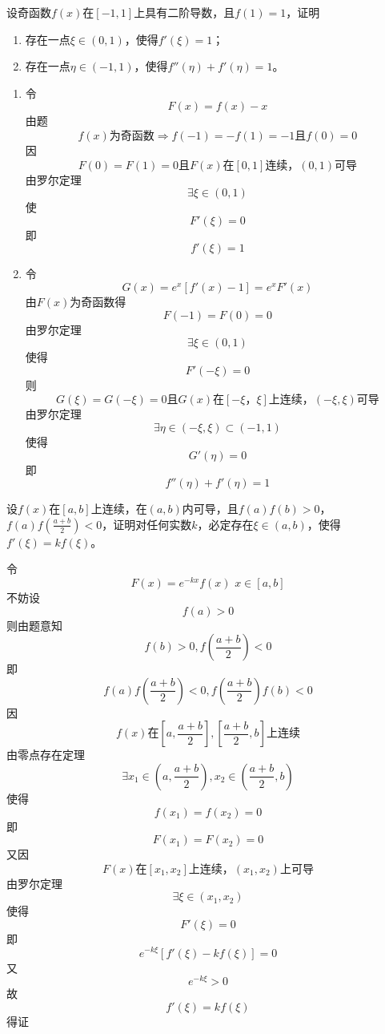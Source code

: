 \begin{example}
	设奇函数$f(x)$在$[-1,1]$上具有二阶导数，且$f(1)=1$，证明
	\begin{enumerate}
		\item 存在一点$\xi\in(0,1)$，使得$f'(\xi)=1$；
		\item 存在一点$\eta\in(-1,1)$，使得$f''(\eta)+f'(\eta)=1$。
	\end{enumerate}
\end{example}
	\begin{newproof}
		\begin{enumerate}
			\item 
			令\[F\left( x \right) =f\left( x \right) -x\]
		由题\[f\left( x \right) 为\text{奇函数}\Longrightarrow f\left( -1 \right) =-f\left( 1 \right) =-1\text{且}f\left( 0 \right) =0\]
		因\[F\left( 0 \right) =F\left( 1 \right) =0\text{且}F\left( x \right) \text{在}\left[ 0,1 \right] \text{连续，}\left( 0,1 \right) \text{可导}\]
		由罗尔定理\[\exists \xi \in \left( 0,1 \right) \]
		使\[F'\left( \xi \right) =0\]
		即\[f'\left( \xi \right) =1\]
			\item
			令\[G\left( x \right) =e^x\left[ f'\left( x \right) -1 \right] =e^xF'\left( x \right) \]
			由$F(x)$为奇函数得\[F\left( -1 \right) =F\left( 0 \right) =0\]
			由罗尔定理\[\exists \xi \in \left( 0,1 \right) \]
			使得\[F'\left( -\xi \right) =0\]
			则\[G\left( \xi \right) =G\left( -\xi \right) =0\text{且}G\left( x \right) \text{在}\left[ -\xi \text{，}\xi \right] \text{上连续，}\left( -\xi ,\xi \right) \text{可导}\]
			由罗尔定理\[\exists \eta \in \left( -\xi ,\xi \right) \subset \left( -1,1 \right) \]
			使得\[G'\left( \eta \right) =0\]
			即\[f''\left( \eta \right) +f'\left( \eta \right) =1\]

		\end{enumerate}
		
	\end{newproof}

\begin{example}
	设$f(x)$在$[a,b]$上连续，在$(a,b)$内可导，且$f(a)f(b)>0$，$f(a)f(\frac{a+b}{2})<0$，证明对任何实数$k$，必定存在$\xi\in(a,b)$，使得$f'(\xi)=kf(\xi)$。
\end{example}
	\begin{newproof}
		令\[F\left( x \right) =e^{-kx}f\left( x \right) \,\,     x\in \left[ a,b \right] \]
		不妨设\[f\left( a \right) >0\]
		则由题意知\[f\left( b \right) >0,f\left( \frac{a+b}{2} \right) <0\]
		即\[f\left( a \right) f\left( \frac{a+b}{2} \right) <0,   f\left( \frac{a+b}{2} \right) f\left( b \right) <0\]
		因\[f\left( x \right) \text{在}\left[ a,\frac{a+b}{2} \right] ,\left[ \frac{a+b}{2},b \right] \text{上连续}\]
		由零点存在定理\[\exists x_1\in \left( a,\frac{a+b}{2} \right) ,x_2\in \left( \frac{a+b}{2},b \right) \]
		使得\[f\left( x_1 \right) =f\left( x_2 \right) =0\]
		即\[F\left( x_1 \right) =F\left( x_2 \right) =0\]
		又因\[F\left( x \right) \text{在}\left[ x_1,x_2 \right] \text{上连续，}\left( x_1,x_2 \right) \text{上可导}\]
		由罗尔定理\[\exists \xi \in \left( x_1,x_2 \right) \]
		使得\[F'\left( \xi \right) =0\]
		即\[e^{-k\xi}\left[ f'\left( \xi \right) -kf\left( \xi \right) \right] =0\]
		又\[e^{-k\xi}>0\]
		故\[f'\left( \xi \right) =kf\left( \xi \right) \]
		得证
	\end{newproof}

